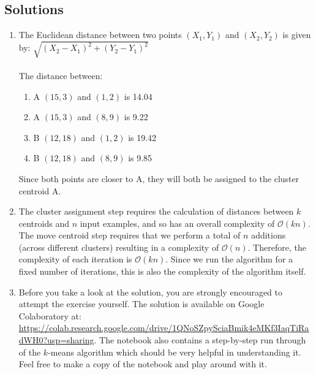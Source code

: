 \subsection{Solutions}

\begin{enumerate}

\item The Euclidean distance between two points $(X_1, Y_1)$ and $(X_2, Y_2)$ is given by: $\sqrt{ (X_2 - X_1)^2 + (Y_2 - Y_1)^2 }$
\\ \\
The distance between: 
\begin{enumerate}
\item A $(15, 3)$  and $(1, 2)$ is 14.04
\item A $(15, 3)$  and $(8, 9)$ is 9.22
\item B $(12, 18)$ and $(1, 2)$ is 19.42
\item B $(12, 18)$ and $(8, 9)$ is 9.85
\end{enumerate}

Since both points are closer to A, they will both be assigned to the cluster centroid A. 

\item  The cluster assignment step requires the calculation of distances between $k$ centroids and $n$ input examples, and so has an overall complexity of $\mathcal{O}(kn)$. The move centroid step requires that we perform a total of $n$ additions (across different clusters) resulting in a complexity of $\mathcal{O}(n)$. Therefore, the complexity of each iteration is $\mathcal{O}(kn)$. Since we run the algorithm for a fixed number of iterations, this is also the complexity of the algorithm itself.

\item Before you take a look at the solution, you are strongly encouraged to attempt the exercise yourself. The solution is available on Google Colaboratory at: { \footnotesize
\url{https://colab.research.google.com/drive/1QNoSZpySciaBmik4eMKf3IaqTiRadWH0?usp=sharing}. 
} The notebook also contains a step-by-step run through of the $k$-means algorithm which should be very helpful in understanding it. Feel free to make a copy of the notebook and play around with it. 

\end{enumerate}



